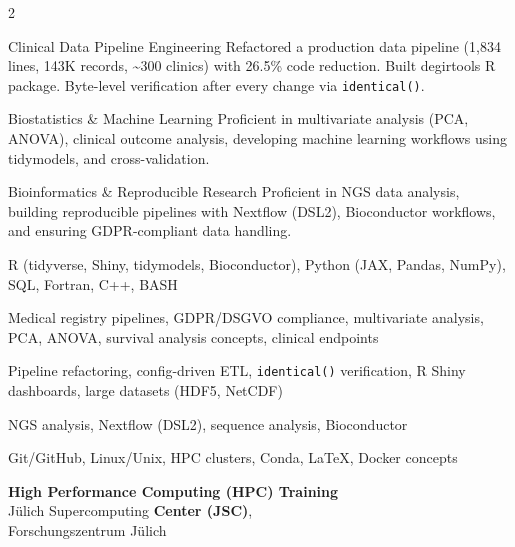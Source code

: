 \documentclass{thejus_cv}
\begin{document}
\begin{paracol}{2}
\switchcolumn



\cvstrength{\faStar}
           {Clinical Data Pipeline Engineering}
           {Refactored a production data pipeline (1,834 lines, 143K records, \textasciitilde300 clinics) with 26.5\% code reduction. Built degirtools R package. Byte-level verification after every change via \texttt{identical()}.}

\cvstrength{\faLightbulb}
           {Biostatistics \& Machine Learning}
           {Proficient in multivariate analysis (PCA, ANOVA), clinical outcome analysis, developing machine learning workflows using tidymodels, and cross-validation.}

\cvstrength{\faAward}
           {Bioinformatics \& Reproducible Research}
           {Proficient in NGS data analysis, building reproducible pipelines with Nextflow (DSL2), Bioconductor workflows, and ensuring GDPR-compliant data handling.}


         {R (tidyverse, Shiny, tidymodels, Bioconductor), Python (JAX, Pandas, NumPy), SQL, Fortran, C++, BASH}

         {Medical registry pipelines, GDPR/DSGVO compliance, multivariate analysis, PCA, ANOVA, survival analysis concepts, clinical endpoints}

         {Pipeline refactoring, config-driven ETL, \texttt{identical()} verification, R Shiny dashboards, large datasets (HDF5, NetCDF)}

         {NGS analysis, Nextflow (DSL2), sequence analysis, Bioconductor}

         {Git/GitHub, Linux/Unix, HPC clusters, Conda, LaTeX, Docker concepts}





\textbf{High Performance Computing (HPC) Training}\\
J\"ulich Supercomputing \textbf{Center (JSC)},\\
Forschungszentrum J\"ulich\\[0.3cm]


\end{paracol}
\end{document}

